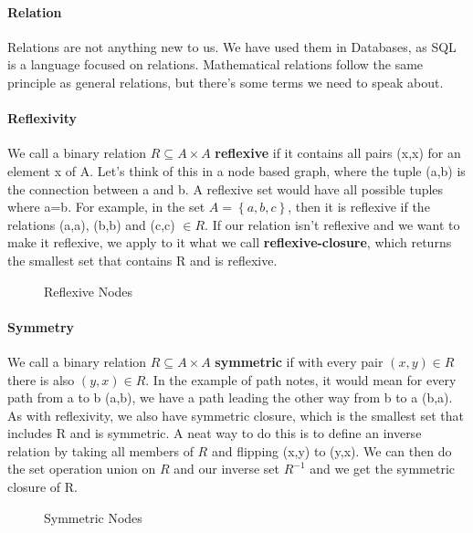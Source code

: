 \paragraph{Relation} Relations are not anything new to us. We have used them in Databases, as SQL is a language focused on relations. Mathematical relations follow the same principle as general relations, but there's some terms we need to speak about.
\paragraph{Reflexivity} We call a binary relation $R \subseteq A \times A$ \textbf{reflexive} if it contains all pairs (x,x) for an element x of A. Let's think of this in a node based graph, where the tuple (a,b) is the connection between a and b. A reflexive set would have all possible tuples where a=b. For example, in the set $A = \left\lbrace a, b, c\right\rbrace$, then it is reflexive if the relations (a,a), (b,b) and (c,c) $\in R$.
If our relation isn't reflexive and we want to make it reflexive, we apply to it what we call \textbf{reflexive-closure}, which returns the smallest set that contains R and is reflexive.
\begin{figure}[!htb]
\caption{\label{fig:reflexive} Reflexive Nodes}
\end{figure}
\paragraph{Symmetry} We call a binary relation $R \subseteq A \times A$ \textbf{symmetric} if with every pair $\left(x,y \right) \in R$ there is also $\left(y,x \right) \in R$. In the example of path notes, it would mean for every path from a to b (a,b), we have a path leading the other way from b to a (b,a). As with reflexivity, we also have symmetric closure, which is the smallest set that includes R and is symmetric. A neat way to do this is to define an inverse relation by taking all members of $R$ and flipping (x,y) to (y,x). We can then do the set operation union on $R$ and our inverse set $R^{-1}$ and we get the symmetric closure of R.
\begin{figure}[!htb]
	\caption{\label{fig:symmetric} Symmetric Nodes}
\end{figure}
